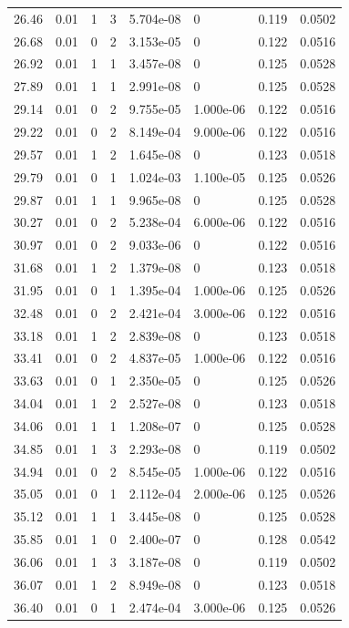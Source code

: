 \documentclass[preview]{standalone}
\begin{document}
{{{\begin{tabular}{L{1.2cm}C{1.2cm} C{0.3cm}C{0.5cm} C{1.4cm}C{1.4cm} C{1.4cm}C{1.4cm}}
  26.46  &  0.01  & 1     &  3 &  5.704e-08  & 0  & 0.119 &  0.0502   \\ 
  26.68  &  0.01  & 0     &  2 &  3.153e-05  & 0  & 0.122 &  0.0516   \\ 
  26.92  &  0.01  & 1     &  1 &  3.457e-08  & 0  & 0.125 &  0.0528   \\ 
  27.89  &  0.01  & 1     &  1 &  2.991e-08  & 0  & 0.125 &  0.0528   \\ 
  29.14  &  0.01  & 0     &  2 &  9.755e-05  & 1.000e-06  & 0.122 &  0.0516   \\ 
  29.22  &  0.01  & 0     &  2 &  8.149e-04  & 9.000e-06  & 0.122 &  0.0516   \\ 
  29.57  &  0.01  & 1     &  2 &  1.645e-08  & 0  & 0.123 &  0.0518   \\ 
  29.79  &  0.01  & 0     &  1 &  1.024e-03  & 1.100e-05  & 0.125 &  0.0526   \\ 
  29.87  &  0.01  & 1     &  1 &  9.965e-08  & 0  & 0.125 &  0.0528   \\ 
  30.27  &  0.01  & 0     &  2 &  5.238e-04  & 6.000e-06  & 0.122 &  0.0516   \\ 
  30.97  &  0.01  & 0     &  2 &  9.033e-06  & 0  & 0.122 &  0.0516   \\ 
  31.68  &  0.01  & 1     &  2 &  1.379e-08  & 0  & 0.123 &  0.0518   \\ 
  31.95  &  0.01  & 0     &  1 &  1.395e-04  & 1.000e-06  & 0.125 &  0.0526   \\ 
  32.48  &  0.01  & 0     &  2 &  2.421e-04  & 3.000e-06  & 0.122 &  0.0516   \\ 
  33.18  &  0.01  & 1     &  2 &  2.839e-08  & 0  & 0.123 &  0.0518   \\ 
  33.41  &  0.01  & 0     &  2 &  4.837e-05  & 1.000e-06  & 0.122 &  0.0516   \\ 
  33.63  &  0.01  & 0     &  1 &  2.350e-05  & 0  & 0.125 &  0.0526   \\ 
  34.04  &  0.01  & 1     &  2 &  2.527e-08  & 0  & 0.123 &  0.0518   \\ 
  34.06  &  0.01  & 1     &  1 &  1.208e-07  & 0  & 0.125 &  0.0528   \\ 
  34.85  &  0.01  & 1     &  3 &  2.293e-08  & 0  & 0.119 &  0.0502   \\ 
  34.94  &  0.01  & 0     &  2 &  8.545e-05  & 1.000e-06  & 0.122 &  0.0516   \\ 
  35.05  &  0.01  & 0     &  1 &  2.112e-04  & 2.000e-06  & 0.125 &  0.0526   \\ 
  35.12  &  0.01  & 1     &  1 &  3.445e-08  & 0  & 0.125 &  0.0528   \\ 
  35.85  &  0.01  & 1     &  0 &  2.400e-07  & 0  & 0.128 &  0.0542   \\ 
  36.06  &  0.01  & 1     &  3 &  3.187e-08  & 0  & 0.119 &  0.0502   \\ 
  36.07  &  0.01  & 1     &  2 &  8.949e-08  & 0  & 0.123 &  0.0518   \\ 
  36.40  &  0.01  & 0     &  1 &  2.474e-04  & 3.000e-06  & 0.125 &  0.0526   \\ 
\hline 
\end{tabular} 

}}}
\end{document}

